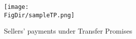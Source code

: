 \hypertarget{sampleTP}{}
\begin{figure}
	\centerline{\texttt{[image: \\FigDir/sampleTP.png]}}
	\caption{Sellers' payments under Transfer Promises}
	\label{fig:sampleTP}
\end{figure}